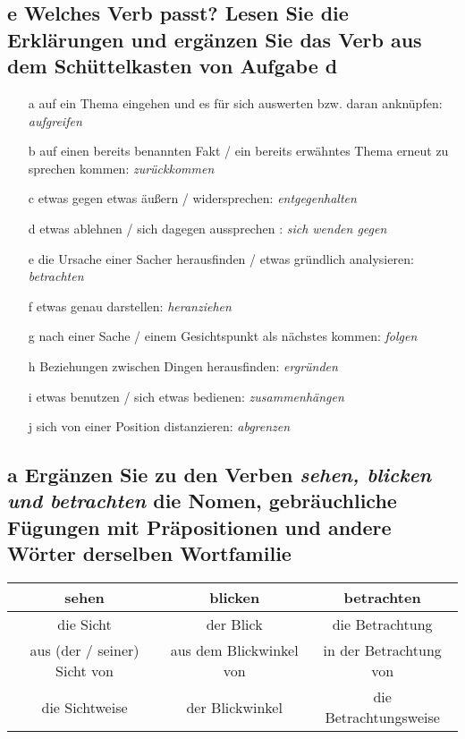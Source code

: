 \documentclass{article}
\begin{document}
	\subsection{\textbf{e} Welches Verb passt? Lesen Sie die Erklärungen und ergänzen Sie das Verb aus dem Schüttelkasten von Aufgabe d}
	\begin{itemize}
			\item[a]{auf ein Thema eingehen und es für sich auswerten bzw. daran anknüpfen: \textit{aufgreifen}}
			\item[b]{auf einen bereits benannten Fakt / ein bereits erwähntes Thema erneut zu sprechen kommen: \textit{zurückkommen}}
			\item[c]{etwas gegen etwas äußern / widersprechen: \textit{entgegenhalten}}
			\item[d]{etwas ablehnen / sich dagegen aussprechen : \textit{sich wenden gegen}}
			\item[e]{die Ursache einer Sacher herausfinden / etwas gründlich analysieren: \textit{betrachten}}
			\item[f]{etwas genau darstellen: \textit{heranziehen}}
			\item[g]{nach einer Sache / einem Gesichtspunkt als nächstes kommen: \textit{folgen}}
			\item[h]{Beziehungen zwischen Dingen herausfinden: \textit{ergründen}}
			\item[i]{etwas benutzen / sich etwas bedienen: \textit{zusammenhängen}}
			\item[j]{sich von einer Position distanzieren: \textit{abgrenzen}}
	\end{itemize}
	\subsection{\textbf{a} Ergänzen Sie zu den Verben \textit{sehen, blicken und betrachten} die Nomen, gebräuchliche Fügungen mit Präpositionen und andere Wörter derselben Wortfamilie}
	\begin{tabular}{| c | c | c |}
		\toprule
		\textbf{sehen} & \textbf{blicken} & \textbf{betrachten}\\ \midrule
		die Sicht & der Blick & die Betrachtung \\
		aus (der / seiner) Sicht von & aus dem Blickwinkel von & in der Betrachtung von \\
		die Sichtweise & der Blickwinkel & die Betrachtungsweise \\
		\bottomrule
	\end{tabular}
\end{document}
